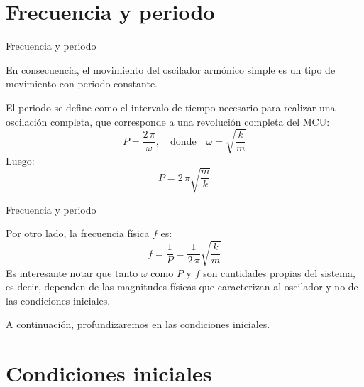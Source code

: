 \documentclass[11pt,handout,aspectratio=1610]{beamer}
\begin{document}
\section{Frecuencia y periodo}

\begin{frame}{Frecuencia y periodo}

    En consecuencia, el movimiento del oscilador armónico simple es un tipo de movimiento con periodo constante.

    \vspace{11pt}

    El periodo se define como el intervalo de tiempo necesario para realizar una oscilación completa, que corresponde a una revolución completa del MCU: $$P = \frac{2 \, \pi}{\omega}, \quad \text{donde} \quad \omega = \sqrt{\frac{k}{m}}$$ Luego: $$P = 2 \, \pi \sqrt{\frac{m}{k}}$$
    
\end{frame}

\begin{frame}{Frecuencia y periodo}

    Por otro lado, la frecuencia física $f$ es: $$ f = \frac{1}{P} = \frac{1}{2 \, \pi} \sqrt{\frac{k}{m}}$$ Es interesante notar que tanto $\omega$ como $P$ y $f$ son cantidades propias del sistema, es decir, dependen de las magnitudes físicas que caracterizan al oscilador y no de las condiciones iniciales.

    \vspace{11pt}

    A continuación, profundizaremos en las condiciones iniciales.
    
\end{frame}

\section{Condiciones iniciales}
\end{document}
